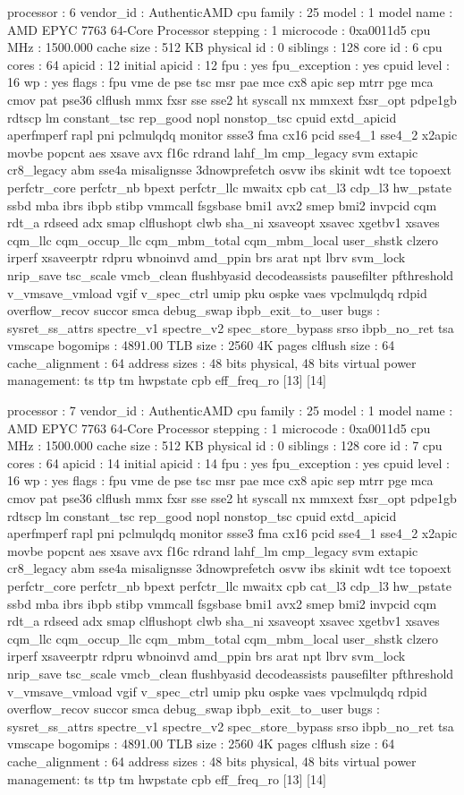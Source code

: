processor	: 6
vendor_id	: AuthenticAMD
cpu family	: 25
model		: 1
model name	: AMD EPYC 7763 64-Core Processor
stepping	: 1
microcode	: 0xa0011d5
cpu MHz		: 1500.000
cache size	: 512 KB
physical id	: 0
siblings	: 128
core id		: 6
cpu cores	: 64
apicid		: 12
initial apicid	: 12
fpu		: yes
fpu_exception	: yes
cpuid level	: 16
wp		: yes
flags		: fpu vme de pse tsc msr pae mce cx8 apic sep mtrr pge mca cmov pat pse36 clflush mmx fxsr sse sse2 ht syscall nx mmxext fxsr_opt pdpe1gb rdtscp lm constant_tsc rep_good nopl nonstop_tsc cpuid extd_apicid aperfmperf rapl pni pclmulqdq monitor ssse3 fma cx16 pcid sse4_1 sse4_2 x2apic movbe popcnt aes xsave avx f16c rdrand lahf_lm cmp_legacy svm extapic cr8_legacy abm sse4a misalignsse 3dnowprefetch osvw ibs skinit wdt tce topoext perfctr_core perfctr_nb bpext perfctr_llc mwaitx cpb cat_l3 cdp_l3 hw_pstate ssbd mba ibrs ibpb stibp vmmcall fsgsbase bmi1 avx2 smep bmi2 invpcid cqm rdt_a rdseed adx smap clflushopt clwb sha_ni xsaveopt xsavec xgetbv1 xsaves cqm_llc cqm_occup_llc cqm_mbm_total cqm_mbm_local user_shstk clzero irperf xsaveerptr rdpru wbnoinvd amd_ppin brs arat npt lbrv svm_lock nrip_save tsc_scale vmcb_clean flushbyasid decodeassists pausefilter pfthreshold v_vmsave_vmload vgif v_spec_ctrl umip pku ospke vaes vpclmulqdq rdpid overflow_recov succor smca debug_swap ibpb_exit_to_user
bugs		: sysret_ss_attrs spectre_v1 spectre_v2 spec_store_bypass srso ibpb_no_ret tsa vmscape
bogomips	: 4891.00
TLB size	: 2560 4K pages
clflush size	: 64
cache_alignment	: 64
address sizes	: 48 bits physical, 48 bits virtual
power management: ts ttp tm hwpstate cpb eff_freq_ro [13] [14]

processor	: 7
vendor_id	: AuthenticAMD
cpu family	: 25
model		: 1
model name	: AMD EPYC 7763 64-Core Processor
stepping	: 1
microcode	: 0xa0011d5
cpu MHz		: 1500.000
cache size	: 512 KB
physical id	: 0
siblings	: 128
core id		: 7
cpu cores	: 64
apicid		: 14
initial apicid	: 14
fpu		: yes
fpu_exception	: yes
cpuid level	: 16
wp		: yes
flags		: fpu vme de pse tsc msr pae mce cx8 apic sep mtrr pge mca cmov pat pse36 clflush mmx fxsr sse sse2 ht syscall nx mmxext fxsr_opt pdpe1gb rdtscp lm constant_tsc rep_good nopl nonstop_tsc cpuid extd_apicid aperfmperf rapl pni pclmulqdq monitor ssse3 fma cx16 pcid sse4_1 sse4_2 x2apic movbe popcnt aes xsave avx f16c rdrand lahf_lm cmp_legacy svm extapic cr8_legacy abm sse4a misalignsse 3dnowprefetch osvw ibs skinit wdt tce topoext perfctr_core perfctr_nb bpext perfctr_llc mwaitx cpb cat_l3 cdp_l3 hw_pstate ssbd mba ibrs ibpb stibp vmmcall fsgsbase bmi1 avx2 smep bmi2 invpcid cqm rdt_a rdseed adx smap clflushopt clwb sha_ni xsaveopt xsavec xgetbv1 xsaves cqm_llc cqm_occup_llc cqm_mbm_total cqm_mbm_local user_shstk clzero irperf xsaveerptr rdpru wbnoinvd amd_ppin brs arat npt lbrv svm_lock nrip_save tsc_scale vmcb_clean flushbyasid decodeassists pausefilter pfthreshold v_vmsave_vmload vgif v_spec_ctrl umip pku ospke vaes vpclmulqdq rdpid overflow_recov succor smca debug_swap ibpb_exit_to_user
bugs		: sysret_ss_attrs spectre_v1 spectre_v2 spec_store_bypass srso ibpb_no_ret tsa vmscape
bogomips	: 4891.00
TLB size	: 2560 4K pages
clflush size	: 64
cache_alignment	: 64
address sizes	: 48 bits physical, 48 bits virtual
power management: ts ttp tm hwpstate cpb eff_freq_ro [13] [14]

